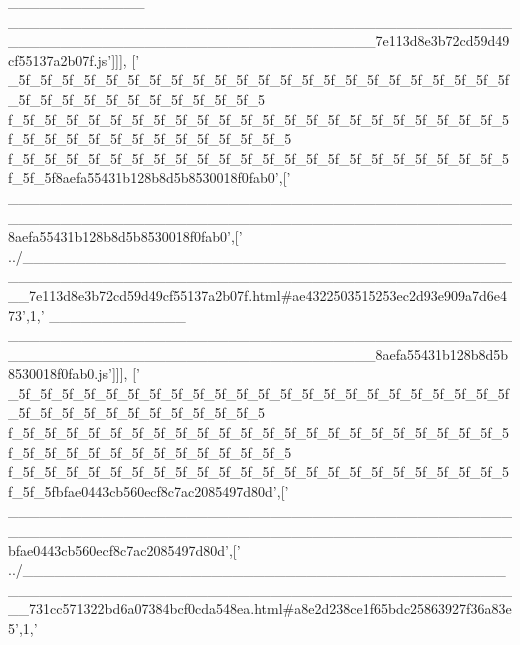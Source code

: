 \begin{DoxyCode}
{      \_\_\_\_\_\_\_\_\_\_\_\_\_
      \_\_\_\_\_\_\_\_\_\_\_\_\_\_\_\_\_\_\_\_\_\_\_\_\_\_\_\_\_\_\_\_\_\_\_\_\_\_\_\_\_\_\_\_\_\_\_\_\_\_\_\_\_\_\_\_\_\_\_\_\_\_\_\_\_\_\_\_\_\_\_\_\_\_\_\_\_\_\_\_\_\_\_7e113d8e3b72cd59d49cf55137a2b07f.js'}]]],
  [\textcolor{stringliteral}{'
      \_5f\_5f\_5f\_5f\_5f\_5f\_5f\_5f\_5f\_5f\_5f\_5f\_5f\_5f\_5f\_5f\_5f\_5f\_5f\_5f\_5f\_5f\_5f\_5f\_5f\_5f\_5f\_5f\_5f\_5f\_5f\_5f\_5f\_5f\_5
      f\_5f\_5f\_5f\_5f\_5f\_5f\_5f\_5f\_5f\_5f\_5f\_5f\_5f\_5f\_5f\_5f\_5f\_5f\_5f\_5f\_5f\_5f\_5f\_5f\_5f\_5f\_5f\_5f\_5f\_5f\_5f\_5f\_5f\_5f\_5f\_5
      f\_5f\_5f\_5f\_5f\_5f\_5f\_5f\_5f\_5f\_5f\_5f\_5f\_5f\_5f\_5f\_5f\_5f\_5f\_5f\_5f\_5f\_5f\_5f\_5f\_5f8aefa55431b128b8d5b8530018f0fab0'},[\textcolor{stringliteral}{'
      \_\_\_\_\_\_\_\_\_\_\_\_\_\_\_\_\_\_\_\_\_\_\_\_\_\_\_\_\_\_\_\_\_\_\_\_\_\_\_\_\_\_\_\_\_\_\_\_\_\_\_\_\_\_\_\_\_\_\_\_\_\_\_\_\_\_\_\_\_\_\_\_\_\_\_\_\_\_\_\_\_\_\_\_\_\_\_\_\_\_\_\_\_\_\_\_8aefa55431b128b8d5b8530018f0fab0'},[\textcolor{stringliteral}{'
      ../\_\_\_\_\_\_\_\_\_\_\_\_\_\_\_\_\_\_\_\_\_\_\_\_\_\_\_\_\_\_\_\_\_\_\_\_\_\_\_\_\_\_\_\_\_\_\_\_\_\_\_\_\_\_\_\_\_\_\_\_\_\_\_\_\_\_\_\_\_\_\_\_\_\_\_\_\_\_\_\_\_\_\_\_\_\_\_\_\_\_\_\_\_\_\_\_7e113d8e3b72cd59d49cf55137a2b07f.html#ae4322503515253ec2d93e909a7d6e473'},1,\textcolor{stringliteral}{'
      \_\_\_\_\_\_\_\_\_\_\_\_\_
      \_\_\_\_\_\_\_\_\_\_\_\_\_\_\_\_\_\_\_\_\_\_\_\_\_\_\_\_\_\_\_\_\_\_\_\_\_\_\_\_\_\_\_\_\_\_\_\_\_\_\_\_\_\_\_\_\_\_\_\_\_\_\_\_\_\_\_\_\_\_\_\_\_\_\_\_\_\_\_\_\_\_\_8aefa55431b128b8d5b8530018f0fab0.js'}]]],
  [\textcolor{stringliteral}{'
      \_5f\_5f\_5f\_5f\_5f\_5f\_5f\_5f\_5f\_5f\_5f\_5f\_5f\_5f\_5f\_5f\_5f\_5f\_5f\_5f\_5f\_5f\_5f\_5f\_5f\_5f\_5f\_5f\_5f\_5f\_5f\_5f\_5f\_5f\_5
      f\_5f\_5f\_5f\_5f\_5f\_5f\_5f\_5f\_5f\_5f\_5f\_5f\_5f\_5f\_5f\_5f\_5f\_5f\_5f\_5f\_5f\_5f\_5f\_5f\_5f\_5f\_5f\_5f\_5f\_5f\_5f\_5f\_5f\_5f\_5f\_5
      f\_5f\_5f\_5f\_5f\_5f\_5f\_5f\_5f\_5f\_5f\_5f\_5f\_5f\_5f\_5f\_5f\_5f\_5f\_5f\_5f\_5f\_5f\_5f\_5f\_5fbfae0443cb560ecf8c7ac2085497d80d'},[\textcolor{stringliteral}{'
      \_\_\_\_\_\_\_\_\_\_\_\_\_\_\_\_\_\_\_\_\_\_\_\_\_\_\_\_\_\_\_\_\_\_\_\_\_\_\_\_\_\_\_\_\_\_\_\_\_\_\_\_\_\_\_\_\_\_\_\_\_\_\_\_\_\_\_\_\_\_\_\_\_\_\_\_\_\_\_\_\_\_\_\_\_\_\_\_\_\_\_\_\_\_\_\_bfae0443cb560ecf8c7ac2085497d80d'},[\textcolor{stringliteral}{'
      ../\_\_\_\_\_\_\_\_\_\_\_\_\_\_\_\_\_\_\_\_\_\_\_\_\_\_\_\_\_\_\_\_\_\_\_\_\_\_\_\_\_\_\_\_\_\_\_\_\_\_\_\_\_\_\_\_\_\_\_\_\_\_\_\_\_\_\_\_\_\_\_\_\_\_\_\_\_\_\_\_\_\_\_\_\_\_\_\_\_\_\_\_\_\_\_\_731cc571322bd6a07384bcf0cda548ea.html#a8e2d238ce1f65bdc25863927f36a83e5'},1,\textcolor{stringliteral}{'
}
\end{DoxyCode}
